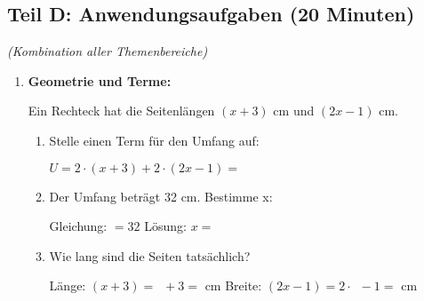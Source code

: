 \subsection*{Teil D: Anwendungsaufgaben (20 Minuten)}
\textit{(Kombination aller Themenbereiche)}

\begin{enumerate}[label=\arabic*., resume]

    \item \textbf{Geometrie und Terme:}

    Ein Rechteck hat die Seitenlängen $(x + 3)$ cm und $(2x - 1)$ cm.

    \vspace{0.5cm}

    \begin{center}
    \end{center}

    \begin{enumerate}[label=\alph*)]
        \item Stelle einen Term für den Umfang auf:

        \vspace{0.3cm}
        $U = 2 \cdot (x + 3) + 2 \cdot (2x - 1) = $ \underline{\hspace{4cm}}

        \vspace{0.5cm}

        \item Der Umfang beträgt 32 cm. Bestimme x:

        \vspace{0.3cm}
        Gleichung: \underline{\hspace{3cm}} $= 32$
        \vspace{0.3cm}
        Lösung: $x = $ \underline{\hspace{2cm}}

        \vspace{0.5cm}

        \item Wie lang sind die Seiten tatsächlich?

        \vspace{0.3cm}
        Länge: $(x + 3) = \phantom{0} + 3 = $ \underline{\hspace{2cm}} cm
        \vspace{0.3cm}
        Breite: $(2x - 1) = 2 \cdot \phantom{0} - 1 = $ \underline{\hspace{2cm}} cm


\end{enumerate}
\end{enumerate}
